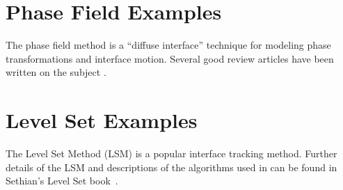 \documentclass[letterpaper,twoside,openright,10pt]{memoir}
\begin{document}
\chapter{Phase Field Examples}

The phase field method is a ``diffuse interface'' technique for
modeling phase transformations and interface motion. Several good
review articles have been written on the subject
\cite{BoettingerReview:2002,ChenReview:2002,McFaddenReview:2002}.






\label{sec:anisotropy}


\label{sec:impingement}


% 

% 
% 
% 
% 

% 
% 


\chapter{Level Set Examples}

The Level Set Method (LSM) is a popular interface tracking
method. Further details of the LSM and descriptions of the algorithms
used in \FiPy{} can be found in Sethian's Level Set
book~\cite{levelSetBook}.





\end{document}
